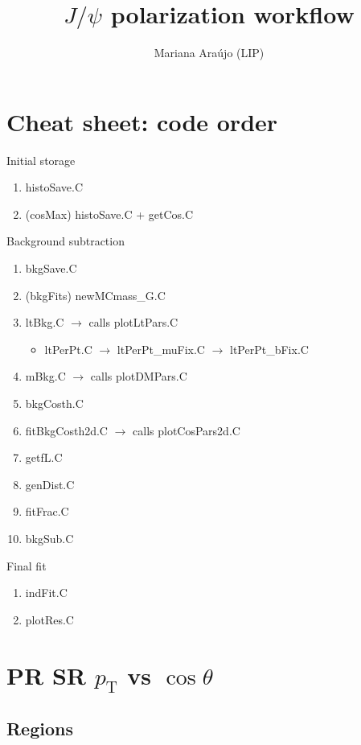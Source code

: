 \documentclass{article}
\newcommand{\pt}{p_\text{T}}
\newcommand{\cost}{\cos\theta}
\begin{document}
\title{$J/\psi$ polarization workflow }
\author{Mariana Ara\'ujo (LIP)}
\maketitle

\tableofcontents

\pagebreak

\section{Cheat sheet: code order}


Initial storage
\begin{enumerate}
\item histoSave.C
\item (cosMax) histoSave.C + getCos.C
\end{enumerate}

Background subtraction
\begin{enumerate}
\item bkgSave.C
\item (bkgFits) newMCmass\_G.C
\item ltBkg.C $\rightarrow$ calls plotLtPars.C
\begin{itemize}
\item ltPerPt.C $\rightarrow$ ltPerPt\_muFix.C $\rightarrow$ ltPerPt\_bFix.C
\end{itemize}
\item mBkg.C $\rightarrow$ calls plotDMPars.C
\item bkgCosth.C
\item fitBkgCosth2d.C $\rightarrow$ calls plotCosPars2d.C
\item getfL.C
\item genDist.C
\item fitFrac.C
\item bkgSub.C
\end{enumerate}

Final fit
\begin{enumerate}
\item indFit.C
\item plotRes.C
\end{enumerate}

\pagebreak

\section{PR SR $\pt$ vs $\cost$}
\subsection{Regions} 
\end{document}
